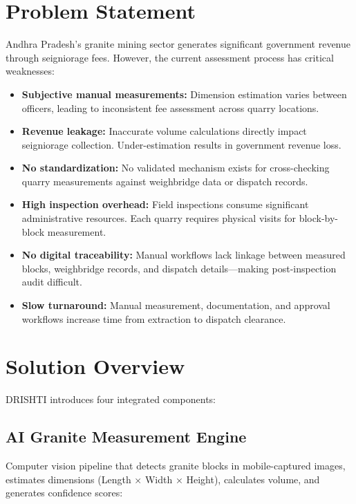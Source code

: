 \documentclass[11pt,a4paper]{article}
\begin{document}
\newpage
\section{Problem Statement}

Andhra Pradesh's granite mining sector generates significant government revenue through seigniorage fees. However, the current assessment process has critical weaknesses:

\begin{itemize}[leftmargin=1.5em, itemsep=4pt]
  \item \textbf{Subjective manual measurements:} Dimension estimation varies between officers, leading to inconsistent fee assessment across quarry locations.
  \item \textbf{Revenue leakage:} Inaccurate volume calculations directly impact seigniorage collection. Under-estimation results in government revenue loss.
  \item \textbf{No standardization:} No validated mechanism exists for cross-checking quarry measurements against weighbridge data or dispatch records.
  \item \textbf{High inspection overhead:} Field inspections consume significant administrative resources. Each quarry requires physical visits for block-by-block measurement.
  \item \textbf{No digital traceability:} Manual workflows lack linkage between measured blocks, weighbridge records, and dispatch details---making post-inspection audit difficult.
  \item \textbf{Slow turnaround:} Manual measurement, documentation, and approval workflows increase time from extraction to dispatch clearance.
\end{itemize}

\newpage
\section{Solution Overview}

DRISHTI introduces four integrated components:

\subsection{AI Granite Measurement Engine}

Computer vision pipeline that detects granite blocks in mobile-captured images, estimates dimensions (Length × Width × Height), calculates volume, and generates confidence scores:
\end{document}
